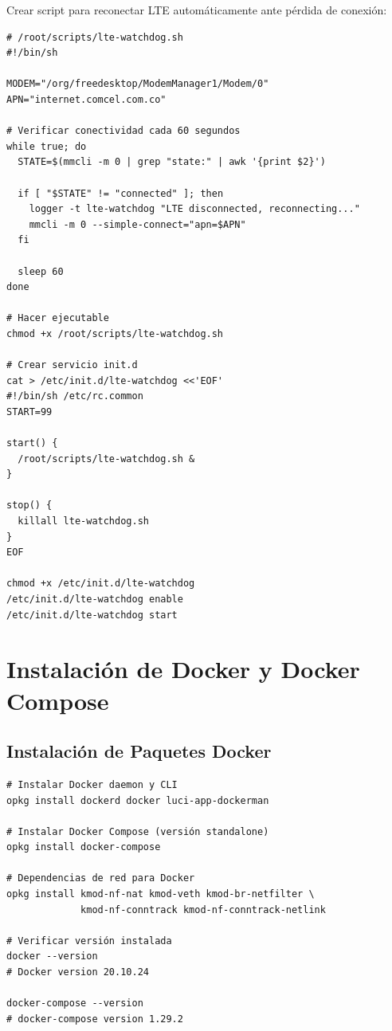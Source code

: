 Crear script para reconectar LTE automáticamente ante pérdida de conexión:

\begin{verbatim}
# /root/scripts/lte-watchdog.sh
#!/bin/sh

MODEM="/org/freedesktop/ModemManager1/Modem/0"
APN="internet.comcel.com.co"

# Verificar conectividad cada 60 segundos
while true; do
  STATE=$(mmcli -m 0 | grep "state:" | awk '{print $2}')
  
  if [ "$STATE" != "connected" ]; then
    logger -t lte-watchdog "LTE disconnected, reconnecting..."
    mmcli -m 0 --simple-connect="apn=$APN"
  fi
  
  sleep 60
done

# Hacer ejecutable
chmod +x /root/scripts/lte-watchdog.sh

# Crear servicio init.d
cat > /etc/init.d/lte-watchdog <<'EOF'
#!/bin/sh /etc/rc.common
START=99

start() {
  /root/scripts/lte-watchdog.sh &
}

stop() {
  killall lte-watchdog.sh
}
EOF

chmod +x /etc/init.d/lte-watchdog
/etc/init.d/lte-watchdog enable
/etc/init.d/lte-watchdog start
\end{verbatim}

\section{Instalación de Docker y Docker Compose}

\subsection{Instalación de Paquetes Docker}

\begin{verbatim}
# Instalar Docker daemon y CLI
opkg install dockerd docker luci-app-dockerman

# Instalar Docker Compose (versión standalone)
opkg install docker-compose

# Dependencias de red para Docker
opkg install kmod-nf-nat kmod-veth kmod-br-netfilter \
             kmod-nf-conntrack kmod-nf-conntrack-netlink

# Verificar versión instalada
docker --version
# Docker version 20.10.24

docker-compose --version
# docker-compose version 1.29.2
\end{verbatim}

